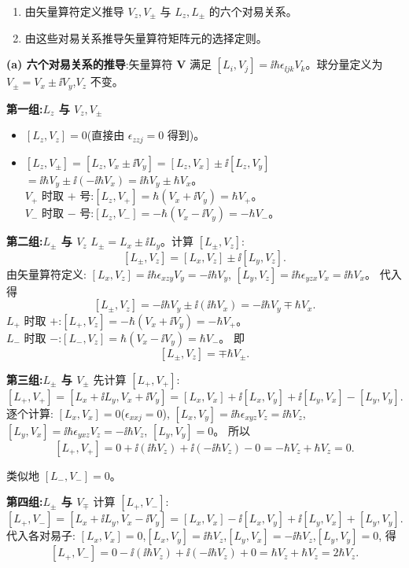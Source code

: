 \begin{question}
\begin{enumerate}
\item 由矢量算符定义推导 $V_z,V_\pm$ 与 $L_z,L_\pm$ 的六个对易关系。
\item 由这些对易关系推导矢量算符矩阵元的选择定则。
\end{enumerate}
\begin{solution}
	\textbf{(a) 六个对易关系的推导}:矢量算符 $\mathbf V$ 满足 $[L_i,V_j]=\ii\hbar\epsilon_{\ii jk}V_k$。球分量定义为 $V_\pm=V_x\pm\ii V_y$,$V_z$ 不变。

	\textbf{第一组:$L_z$ 与 $V_z,V_\pm$}
	\begin{itemize}
	\item $[L_z,V_z]=0$(直接由 $\epsilon_{zzj}=0$ 得到)。
	\item $[L_z,V_\pm] = [L_z,V_x\pm\ii V_y] = [L_z,V_x]\pm\ii[L_z,V_y]$\\
	$= \ii\hbar V_y \pm\ii(-\ii\hbar V_x) = \ii\hbar V_y\pm\hbar V_x$。\\
	$V_+$ 时取 $+$ 号:$[L_z,V_+]=\hbar(V_x+\ii V_y)=\hbar V_+$。\\
	$V_-$ 时取 $-$ 号:$[L_z,V_-]=-\hbar(V_x-\ii V_y)=-\hbar V_-$。
	\end{itemize}

	\textbf{第二组:$L_\pm$ 与 $V_z$}
	$L_\pm = L_x\pm\ii L_y$。计算 $[L_\pm,V_z]$:
	\[
	[L_\pm,V_z] = [L_x,V_z]\pm\ii[L_y,V_z].
	\]
	由矢量算符定义:
	$[L_x,V_z]=\ii\hbar\epsilon_{xzy}V_y = -\ii\hbar V_y$,
	$[L_y,V_z]=\ii\hbar\epsilon_{yzx}V_x = \ii\hbar V_x$。
	代入得
	\[
	[L_\pm,V_z] = -\ii\hbar V_y \pm\ii(\ii\hbar V_x) = -\ii\hbar V_y \mp\hbar V_x.
	\]
	$L_+$ 时取 $+$:$[L_+,V_z] = -\hbar(V_x+\ii V_y) = -\hbar V_+$。\\
	$L_-$ 时取 $-$:$[L_-,V_z] = \hbar(V_x-\ii V_y) = \hbar V_-$。
	即
	\[
	[L_\pm,V_z] = \mp\hbar V_\pm.
	\]

	\textbf{第三组:$L_\pm$ 与 $V_\pm$} 先计算 $[L_+,V_+]$:
	\[
	[L_+,V_+] = [L_x+\ii L_y, V_x+\ii V_y]
	= [L_x,V_x] + \ii[L_x,V_y] + \ii[L_y,V_x] - [L_y,V_y].
	\]
	逐个计算:
	$[L_x,V_x]=0$($\epsilon_{xxj}=0$),
	$[L_x,V_y]=\ii\hbar\epsilon_{xyz}V_z = \ii\hbar V_z$,
	$[L_y,V_x]=\ii\hbar\epsilon_{yxz}V_z = -\ii\hbar V_z$,
	$[L_y,V_y]=0$。
	所以
	\[
	[L_+,V_+] = 0 + \ii(\ii\hbar V_z) + \ii(-\ii\hbar V_z) - 0 = -\hbar V_z + \hbar V_z = 0.
	\]

	类似地 $[L_-,V_-]=0$。

	\textbf{第四组:$L_\pm$ 与 $V_\mp$} 计算 $[L_+,V_-]$:
	\[
	[L_+,V_-] = [L_x+\ii L_y, V_x-\ii V_y]
	= [L_x,V_x] -\ii[L_x,V_y] +\ii[L_y,V_x] + [L_y,V_y].
	\]
	代入各对易子:
	$[L_x,V_x]=0$,$[L_x,V_y]=\ii\hbar V_z$,$[L_y,V_x]=-\ii\hbar V_z$,$[L_y,V_y]=0$,
	得
	\[
	[L_+,V_-] = 0 - \ii(\ii\hbar V_z) + \ii(-\ii\hbar V_z) + 0 = \hbar V_z + \hbar V_z = 2\hbar V_z.
	\]


\end{solution}
\end{question}
